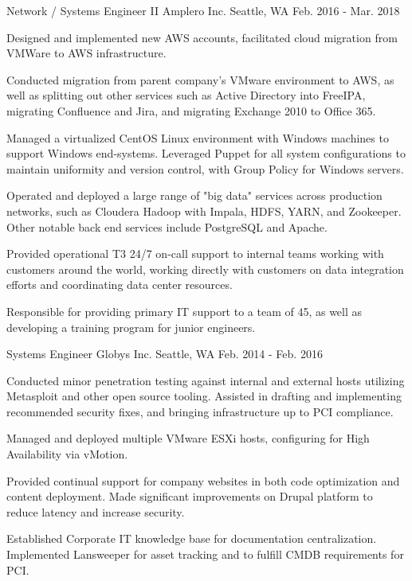 \begin{cventries}
\cventry
{Network / Systems Engineer II} %
{Amplero Inc.} %
{Seattle, WA} %
{Feb. 2016 - Mar. 2018} %
{ %
\begin{cvitems}
\item {Designed and implemented new AWS accounts, facilitated cloud migration from VMWare to AWS infrastructure.}
\item {Conducted migration from parent company's VMware environment to AWS, as well as splitting out other services such as Active Directory into FreeIPA, migrating Confluence and Jira, and migrating Exchange 2010 to Office 365.}
\item {Managed a virtualized CentOS Linux environment with Windows machines to support Windows end-systems. Leveraged Puppet for all system configurations to maintain uniformity and version control, with Group Policy for Windows servers.}
\item {Operated and deployed a large range of "big data" services across production networks, such as Cloudera Hadoop with Impala, HDFS, YARN, and Zookeeper. Other notable back end services include PostgreSQL and Apache.}
\item {Provided operational T3 24/7 on-call support to internal teams working with customers around the world, working directly with customers on data integration efforts and coordinating data center resources.}
\item {Responsible for providing primary IT support to a team of 45, as well as developing a training program for junior engineers.}\
\end{cvitems}
}


\cventry
{Systems Engineer} %
{Globys Inc.} %
{Seattle, WA} %
{Feb. 2014 - Feb. 2016} %
{ %
\begin{cvitems}
\item {Conducted minor penetration testing against internal and external hosts utilizing Metasploit and other open source tooling. Assisted in drafting and implementing recommended security fixes, and bringing infrastructure up to PCI compliance.}
\item {Managed and deployed multiple VMware ESXi hosts, configuring for High Availability via vMotion.}
\item {Provided continual support for company websites in both code optimization and content deployment. Made significant improvements on Drupal platform to reduce latency and increase security.}
\item {Established Corporate IT knowledge base for documentation centralization. Implemented Lansweeper for asset tracking and to fulfill CMDB requirements for PCI.}
\end{cvitems}
}



\end{cventries}
